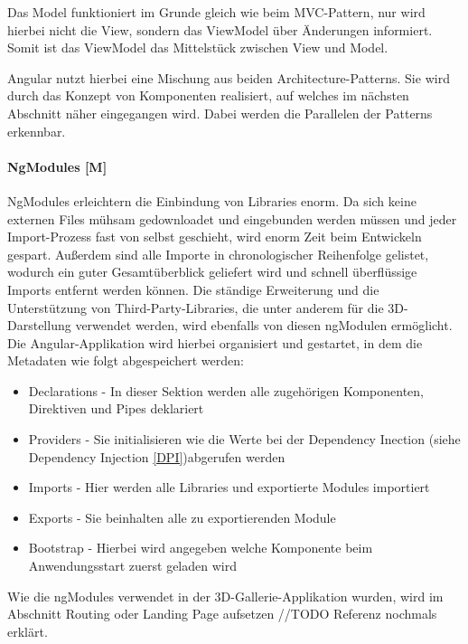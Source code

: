 Das Model funktioniert im Grunde gleich wie beim MVC-Pattern, nur wird hierbei nicht die View, sondern das ViewModel über Änderungen informiert. Somit ist das ViewModel das Mittelstück zwischen View und Model.

Angular nutzt hierbei eine Mischung aus beiden Architecture-Patterns. Sie wird durch das Konzept von Komponenten realisiert, auf welches im nächsten Abschnitt näher eingegangen wird. Dabei werden die Parallelen der Patterns erkennbar.
\cite{MVVM}

\paragraph{NgModules [M]}\label{sec:NgModules}
NgModules erleichtern die Einbindung von Libraries enorm. Da sich keine externen Files mühsam gedownloadet und eingebunden werden müssen und jeder Import-Prozess fast von selbst geschieht, wird enorm Zeit beim Entwickeln gespart. Außerdem sind alle Importe in chronologischer Reihenfolge gelistet, wodurch ein guter Gesamtüberblick geliefert wird und schnell überflüssige Imports entfernt werden können. Die ständige Erweiterung und die Unterstützung von Third-Party-Libraries, die unter anderem für die 3D-Darstellung verwendet werden, wird ebenfalls von diesen ngModulen ermöglicht. Die Angular-Applikation wird hierbei organisiert und gestartet, in dem die Metadaten wie folgt abgespeichert werden:

\begin{itemize}
  \item Declarations - In dieser Sektion werden alle zugehörigen Komponenten, Direktiven und Pipes deklariert 
  \item Providers - Sie initialisieren wie die Werte bei der Dependency Inection (siehe Dependency Injection \ref{DPI})abgerufen werden \cite{AngularProviders}
  \item Imports - Hier werden alle Libraries und exportierte Modules importiert
  \item Exports - Sie beinhalten alle zu exportierenden Module
  \item Bootstrap - Hierbei wird angegeben welche Komponente beim Anwendungsstart zuerst geladen wird
\end{itemize}

Wie die ngModules verwendet in der 3D-Gallerie-Applikation wurden, wird im Abschnitt Routing oder Landing Page aufsetzen //TODO Referenz nochmals erklärt.
\cite{AngularNgModules}
\cite{AngularNgModulesAPI}
\cite{AngularBuch}


